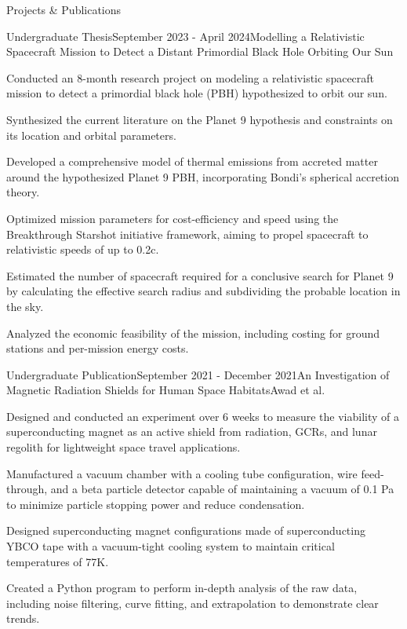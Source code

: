 \documentclass{resume} %
\begin{document}
\begin{rSection}{Projects \& Publications}

\begin{rSubsection}{Undergraduate Thesis}{September 2023 - April 2024}{Modelling a Relativistic Spacecraft Mission to Detect a Distant Primordial Black Hole Orbiting Our Sun}{}
\item Conducted an 8-month research project on modeling a relativistic spacecraft mission to detect a primordial black hole (PBH) hypothesized to orbit our sun.
\item Synthesized the current literature on the Planet 9 hypothesis and constraints on its location and orbital parameters.
\item Developed a comprehensive model of thermal emissions from accreted matter around the hypothesized Planet 9 PBH, incorporating Bondi's spherical accretion theory.
\item Optimized mission parameters for cost-efficiency and speed using the Breakthrough Starshot initiative framework, aiming to propel spacecraft to relativistic speeds of up to 0.2c.
\item Estimated the number of spacecraft required for a conclusive search for Planet 9 by calculating the effective search radius and subdividing the probable location in the sky.
\item Analyzed the economic feasibility of the mission, including costing for ground stations and per-mission energy costs.
\end{rSubsection}

\begin{rSubsection}{Undergraduate Publication}{September 2021 - December 2021}{An Investigation of Magnetic Radiation Shields for Human Space Habitats}{Awad et al.}
\item Designed and conducted an experiment over 6 weeks to measure the viability of a superconducting magnet as an active shield from radiation, GCRs, and lunar regolith for lightweight space travel applications.
\item Manufactured a vacuum chamber with a cooling tube configuration, wire feed-through, and a beta particle detector capable of maintaining a vacuum of 0.1 Pa to minimize particle stopping power and reduce condensation.
\item Designed superconducting magnet configurations made of superconducting YBCO tape with a vacuum-tight cooling system to maintain critical temperatures of 77K.
\item Created a Python program to perform in-depth analysis of the raw data, including noise filtering, curve fitting, and extrapolation to demonstrate clear trends.
\end{rSubsection}


\end{rSection}
\end{document}
